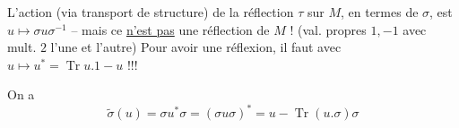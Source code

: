 L'action (via transport de structure) de la réflection $\tau$ sur $M$, en termes de $\sigma$, est $u\longmapsto\sigma u\sigma^{-1}$ -- mais ce \uline{n'est pas} une réflection de $M$ ! (val. propres $1,-1$ avec mult. $2$ l'une et l'autre) Pour avoir une réflexion, il faut  avec $u\longmapsto u^*=\operatorname{Tr}u.1-u$ !!!

On a
\[
\boxed{\widetilde\sigma(u)=\sigma u^*\sigma=(\sigma u\sigma)^*=u-\operatorname{Tr}(u.\sigma)\sigma}
\]
